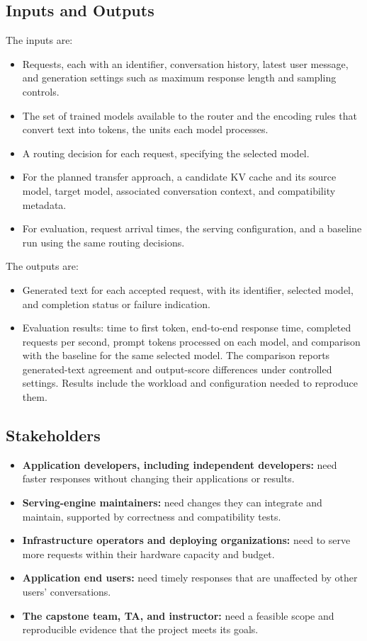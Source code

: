 \documentclass[11pt]{article}
\begin{document}
\subsection{Inputs and Outputs}

The inputs are:
\begin{itemize}[noitemsep]
  \item Requests, each with an identifier, conversation history, latest
  user message, and generation settings such as maximum response length
  and sampling controls.
  \item The set of trained models available to the router and the encoding
  rules that convert text into tokens, the units each model processes.
  \item A routing decision for each request, specifying the selected model.
  \item For the planned transfer approach, a candidate KV cache and its
  source model, target model, associated conversation context, and
  compatibility metadata.
  \item For evaluation, request arrival times, the serving configuration,
  and a baseline run using the same routing decisions.
\end{itemize}

The outputs are:
\begin{itemize}[noitemsep]
  \item Generated text for each accepted request, with its identifier,
  selected model, and completion status or failure indication.
  \item Evaluation results: time to first token, end-to-end response time,
  completed requests per second, prompt tokens processed on each model,
  and comparison with the baseline for the same selected model. The
  comparison reports generated-text agreement and output-score differences
  under controlled settings. Results include the workload and configuration
  needed to reproduce them.
\end{itemize}

\subsection{Stakeholders}
\label{sec:stakeholders}

\begin{itemize}
  \item \textbf{Application developers, including independent developers:}
  need faster responses without changing their applications or results.
  \item \textbf{Serving-engine maintainers:} need changes they can
  integrate and maintain, supported by correctness and compatibility tests.
  \item \textbf{Infrastructure operators and deploying organizations:}
  need to serve more requests within their hardware capacity and budget.
  \item \textbf{Application end users:} need timely responses that are
  unaffected by other users' conversations.
  \item \textbf{The capstone team, TA, and instructor:} need a feasible
  scope and reproducible evidence that the project meets its goals.
\end{itemize}
\end{document}
